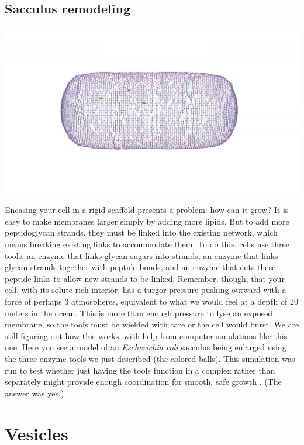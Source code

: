 \documentclass[]{tufte-book}
\begin{document}
\subsection{Sacculus remodeling}\label{Sacculus_remodeling}

\includegraphics{img/schematics/2_3_2}

Encasing your cell in a rigid scaffold presents a problem: how can it
grow? It is easy to make membranes larger simply by adding more lipids.
But to add more peptidoglycan strands, they must be linked into the
existing network, which means breaking existing links to accommodate
them. To do this, cells use three tools: an enzyme that links glycan
sugars into strands, an enzyme that links glycan strands together with
peptide bonds, and an enzyme that cuts these peptide links to allow new
strands to be linked. Remember, though, that your cell, with its
solute-rich interior, has a turgor pressure pushing outward with a force
of perhaps 3 atmospheres, equivalent to what we would feel at a depth of
20 meters in the ocean. This is more than enough pressure to lyse an
exposed membrane, so the tools must be wielded with care or the cell
would burst. We are still figuring out how this works, with help from
computer simulations like this one. Here you see a model of an
\emph{Escherichia coli} sacculus being enlarged using the three enzyme
tools we just described (the colored balls). This simulation was run to
test whether just having the tools function in a complex rather than
separately might provide enough coordination for smooth, safe growth
\citep{nguyen2015}. (The answer was yes.)

\section{Vesicles}\label{vesicles}
\end{document}
